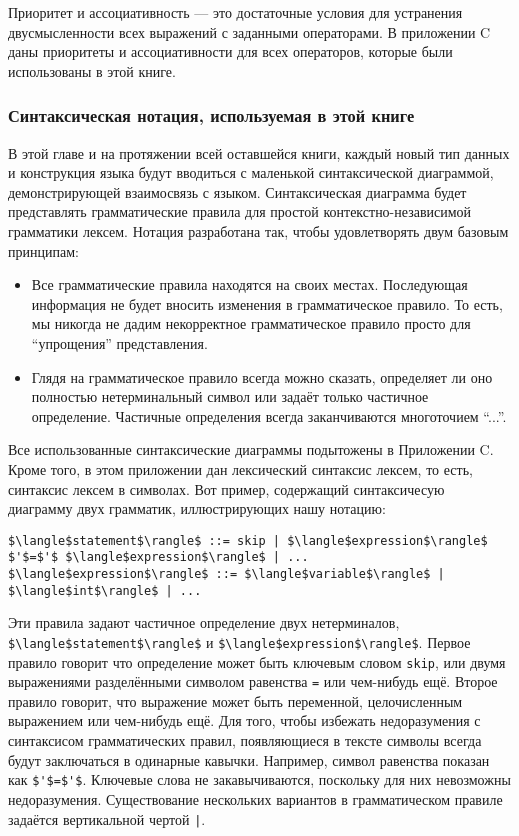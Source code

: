 Приоритет и ассоциативность --- это достаточные условия для устранения двусмысленности всех выражений с заданными операторами. В приложении C даны приоритеты и ассоциативности для всех операторов, которые были использованы в этой книге.

\subsubsection{Синтаксическая нотация, используемая в этой книге}

В этой главе и на протяжении всей оставшейся книги, каждый новый тип данных и конструкция языка будут вводиться с маленькой синтаксической диаграммой, демонстрирующей взаимосвязь с языком. Синтаксическая диаграмма будет представлять грамматические правила для простой контекстно-независимой грамматики лексем. Нотация разработана так, чтобы удовлетворять двум базовым принципам:

\begin{itemize}
\item{Все грамматические правила находятся на своих местах. Последующая информация не будет вносить изменения в грамматическое правило. То есть, мы никогда не дадим некорректное грамматическое правило просто для ``упрощения'' представления.}

\item{Глядя на грамматическое правило всегда можно сказать, определяет ли оно полностью нетерминальный символ или задаёт только частичное определение. Частичные определения всегда заканчиваются многоточием ``...''.}
\end{itemize}

Все использованные синтаксические диаграммы подытожены в Приложении C. Кроме того, в этом приложении дан лексический синтаксис лексем, то есть, синтаксис лексем в символах. Вот пример, содержащий синтаксичесую диаграмму двух грамматик, иллюстрирующих нашу нотацию:

\begin{lstlisting}
$\langle$statement$\rangle$ ::= skip | $\langle$expression$\rangle$ $'$=$'$ $\langle$expression$\rangle$ | ...
$\langle$expression$\rangle$ ::= $\langle$variable$\rangle$ | $\langle$int$\rangle$ | ...
\end{lstlisting}

Эти правила задают частичное определение двух нетерминалов, \lstinline|$\langle$statement$\rangle$| и \lstinline|$\langle$expression$\rangle$|. Первое правило говорит что определение может быть ключевым словом \lstinline|skip|, или двумя выражениями разделёнными символом равенства \lstinline|=| или чем-нибудь ещё. Второе правило говорит, что выражение может быть переменной, целочисленным выражением или чем-нибудь ещё. Для того, чтобы избежать недоразумения с синтаксисом грамматических правил, появляющиеся в тексте символы всегда будут заключаться в одинарные кавычки. Например, символ равенства показан как \lstinline|$'$=$'$|. Ключевые слова не закавычиваются, поскольку для них невозможны недоразумения. Существование нескольких вариантов в грамматическом правиле задаётся вертикальной чертой \lstinline!|!.

